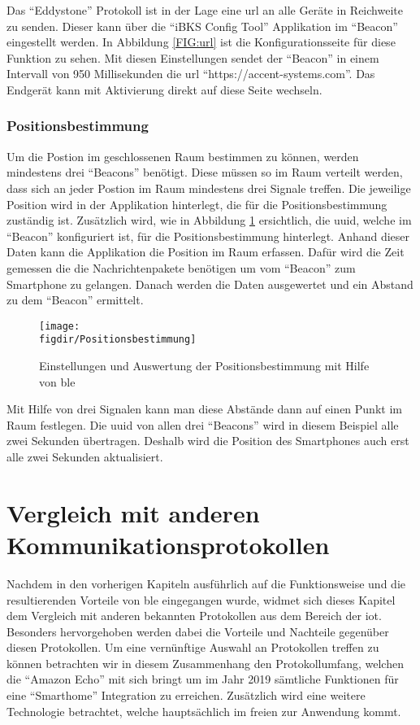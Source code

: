 Das "`Eddystone"' Protokoll ist in der Lage eine \ac{url} an alle Geräte in Reichweite zu senden. Dieser kann über die "`iBKS Config Tool"' Applikation im "`Beacon"' eingestellt werden. In Abbildung \ref{FIG:url} ist die Konfigurationsseite für diese Funktion zu sehen. Mit diesen Einstellungen sendet der "`Beacon"' in einem Intervall von 950 Millisekunden die \ac{url} "`https://accent-systems.com"'. Das Endgerät kann mit Aktivierung direkt auf diese Seite wechseln.\\   

\subsubsection{Positionsbestimmung}
\label{sss:ibeacon:position}

Um die Postion im geschlossenen Raum bestimmen zu können, werden mindestens drei "`Beacons"' benötigt. Diese müssen so im Raum verteilt werden, dass sich an jeder Postion im Raum mindestens drei Signale treffen. Die jeweilige Position wird in der Applikation hinterlegt, die für die Positionsbestimmung zuständig ist. Zusätzlich wird, wie in Abbildung \ref{FIG:poition} ersichtlich, die \ac{uuid}, welche im "`Beacon"' konfiguriert ist, für die Positionsbestimmung hinterlegt. Anhand dieser Daten kann die Applikation die Position im Raum erfassen. Dafür wird die Zeit gemessen die die Nachrichtenpakete benötigen um vom "`Beacon"' zum Smartphone zu gelangen. Danach werden die Daten ausgewertet und ein Abstand zu dem "`Beacon"' ermittelt.
\begin{figure}[hbtp]
	\centering
	\texttt{[image: \\figdir/Positionsbestimmung]}
	\caption{Einstellungen und Auswertung der Positionsbestimmung mit Hilfe von \ac{ble}}
	\label{FIG:poition}
\end{figure} 
Mit Hilfe von drei Signalen kann man diese Abstände dann auf einen Punkt im Raum festlegen. Die \ac{uuid} von allen drei "`Beacons"' wird in diesem Beispiel alle zwei Sekunden übertragen. Deshalb wird die Position des Smartphones auch erst alle zwei Sekunden aktualisiert.\\

\section{Vergleich mit anderen Kommunikationsprotokollen}
\label{s:vergleich}

Nachdem in den vorherigen Kapiteln ausführlich auf die Funktionsweise und die resultierenden Vorteile von \ac{ble} eingegangen wurde, widmet sich dieses Kapitel dem Vergleich mit anderen bekannten Protokollen aus dem Bereich der \ac{iot}. Besonders hervorgehoben werden dabei die Vorteile und Nachteile gegenüber diesen Protokollen. Um eine vernünftige Auswahl an Protokollen treffen zu können betrachten wir in diesem Zusammenhang den Protokollumfang, welchen die "`Amazon Echo"' mit sich bringt um im Jahr 2019 sämtliche Funktionen für eine "`Smarthome"' Integration zu erreichen. Zusätzlich wird eine weitere Technologie betrachtet, welche hauptsächlich im freien zur Anwendung kommt.\\  

